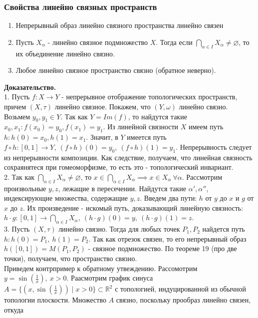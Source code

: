 \subsubsection{Свойства линейно связных пространств}
\begin{enumerate}
    \item Непрерывный образ линейно связного пространства линейно связен
    \item Пусть $X_\alpha$  - линейно связное подмножество $X$. 
Тогда если $\bigcap\limits_{\alpha\in I}X_\alpha\ne\varnothing$, то их 
объединение линейно связно.
\item Любое линейно связное пространство связно (обратное неверно).

\end{enumerate}
\textbf{Доказательство.}\\
1. Пусть $f\colon X\to Y$ - непрерывное отображение топологических 
пространств, причем  $(X,\tau)$ линейно связное. Покажем, что  $(Y,\omega)$
линейно связно. Возьмем  $y_0,y_1\in Y$. Так как $Y=Im(f)$, то найдутся
такие  $x_0,x_1:f(x_0)=y_0,f(x_1)=y_1$. Из линейной связности $X$ имеем
путь  $h:h(0)=x_0,h(1)=x_1$. Значит, в  $Y$ имеется путь  $f\circ h\colon
[0,1]\to Y,~(f\circ h)(0)=y_0,~(f\circ h)(1)=y_1$. Непрерывность следует из 
непрерывности композиции. Как следствие, получаем, что линейная связность 
сохраянятеся при гомеоморфизме, то есть это - топологический инвариант.\\
2. Так как $\bigcap\limits_{\alpha\in I}X_\alpha\ne\varnothing$, то
$x\in\bigcap\limits_{\alpha\in I}X_\alpha\implies x\in X_\alpha~\forall\alpha$.
Рассмотрим произвольные $y,z$, лежащие в пересечении. Найдутся такие 
$\alpha',\alpha''$, индексирующие множества, содержащие $y,z$. 
Введем два пути: $h$ от  $y$ до  $x$ и  $g$ от  $x$ до  $z$.
Их произведение - искомый путь, доказывающий линейную связность: 
$h\cdot g\colon[0,1]\to\bigcap\limits_{\alpha\in I}X_\alpha,~
(h\cdot g)(0)=y,~(h\cdot g)(1)=z$.\\
3. Пусть $(X,\tau)$ линейно связно. Тогда для любых точек  $P_1,P_2$ 
найдется путь  $h:h(0)=P_1,~h(1)=P_2$. Так как отрезок связен, то его
непрерывный образ $h([0,1])=M(P_1,P_2)$ - связное подмножество. По теореме
19 (про две точки), получаем, что пространство связно.\\
Приведем контрпример к обратному утвеждению. Рассомотрим 
$y=\sin(\frac{1}{x}),~x>0$. 
Раасмотрим график синуса 
$A=\{(x,\sin(\frac{1}{x}))\mid x>0\}\subset \mathbb{R}^2$ 
с топологией, индуцированной из обычной топологии плоскости.
Множество $A$ связно, поскольку прообраз линейно связен, откуда 
